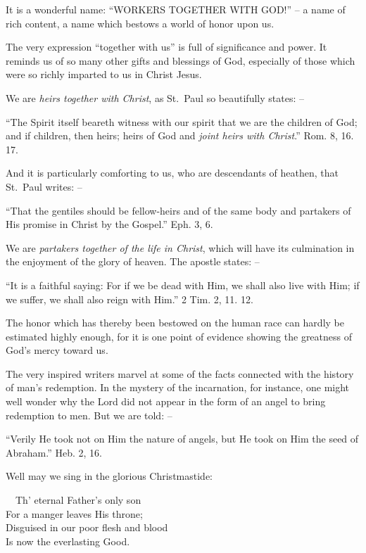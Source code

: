 \documentclass[
]{book}
\begin{document}
It is a wonderful name: ``WORKERS TOGETHER WITH GOD!'' -- a name of rich content, a name which bestows a world of honor upon us.

The very expression ``together with us'' is full of significance and power. It reminds us of so many other gifts and blessings of God, especially of those which were so richly imparted to us in Christ Jesus.

We are \emph{heirs together with Christ}, as St.~Paul so beautifully states: --

``The Spirit itself beareth witness with our spirit that we are the children of God; and if children, then heirs; heirs of God and \emph{joint heirs with Christ}.'' Rom. 8, 16. 17.

And it is particularly comforting to us, who are descendants of heathen, that St.~Paul writes: --

``That the gentiles should be fellow-heirs and of the same body and partakers of His promise in Christ by the Gospel.'' Eph. 3, 6.

We are \emph{partakers together of the life in Christ}, which will have its culmination in the enjoyment of the glory of heaven. The apostle states: --

``It is a faithful saying: For if we be dead with Him, we shall also live with Him; if we suffer, we shall also reign with Him.'' 2 Tim. 2, 11. 12.

The honor which has thereby been bestowed on the human race can hardly be estimated highly enough, for it is one point of evidence showing the greatness of God's mercy toward us.

The very inspired writers marvel at some of the facts connected with the history of man's redemption. In the mystery of the incarnation, for instance, one might well wonder why the Lord did not appear in the form of an angel to bring redemption to men. But we are told: --

``Verily He took not on Him the nature of angels, but He took on Him the seed of Abraham.'' Heb. 2, 16.

Well may we sing in the glorious Christmastide:

~~Th' eternal Father's only son\\
\hspace*{0.333em}\hspace*{0.333em}For a manger leaves His throne;\\
\hspace*{0.333em}\hspace*{0.333em}Disguised in our poor flesh and blood\\
\hspace*{0.333em}\hspace*{0.333em}Is now the everlasting Good.
\end{document}
